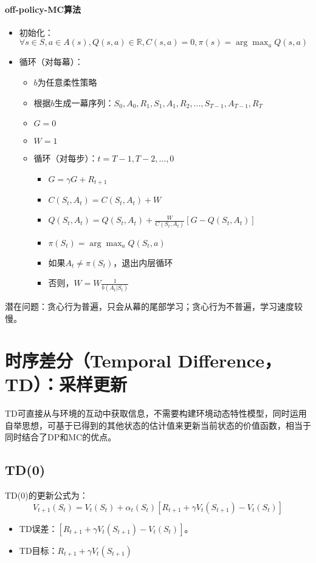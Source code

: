 \documentclass[
12pt, %
a4paper, 
oneside, %
headinclude,footinclude, %
]{scrartcl}
\begin{document}
\paragraph{off-policy-MC算法}
\begin{itemize}
\item 初始化：$ \forall s \in S, a \in A(s), Q(s,a) \in \mathbb{R}, C(s,a) = 0, \pi(s) = \arg \max_a Q(s,a) $
\item 循环（对每幕）：
\begin{itemize}
\item $ b $为任意柔性策略
\item 根据$ b $生成一幕序列：$ S_0,A_0,R_1,S_1,A_1,R_2,\dots,S_{T - 1},A_{T - 1},R_T $
\item $ G = 0 $
\item $ W = 1 $
\item 循环（对每步）：$ t = T - 1, T - 2, \dots, 0 $
\begin{itemize}
\item $ G = \gamma G + R_{t + 1} $ 
\item $ C(S_t,A_t) = C(S_t,A_t) + W $
\item $ Q(S_t,A_t) = Q(S_t,A_t) + \frac{W}{C(S_t,A_t)}[G - Q(S_t,A_t)] $
\item $ \pi(S_t) = \arg \max_a Q(S_t,a) $
\item 如果$ A_t \neq \pi(S_t) $，退出内层循环
\item 否则，$ W = W\frac{1}{b(A_t|S_t)} $
\end{itemize}
\end{itemize}
\end{itemize}

潜在问题：贪心行为普遍，只会从幕的尾部学习；贪心行为不普遍，学习速度较慢。
\section{时序差分（Temporal Difference，TD）：采样更新}
TD可直接从与环境的互动中获取信息，不需要构建环境动态特性模型，同时运用自举思想，可基于已得到的其他状态的估计值来更新当前状态的价值函数，相当于同时结合了DP和MC的优点。
\subsection{TD(0)}
TD(0)的更新公式为：
$$
V_{t + 1}(S_t) = V_t(S_t) + \alpha_t(S_t)[R_{t + 1} + \gamma V_t(S_{t + 1}) - V_t(S_t)]
$$
\begin{itemize}
\item TD误差：$ [R_{t + 1} + \gamma V_t(S_{t + 1}) - V_t(S_t)] $。
\item TD目标：$ R_{t + 1} + \gamma V_t(S_{t + 1}) $
\end{itemize}
\end{document}
